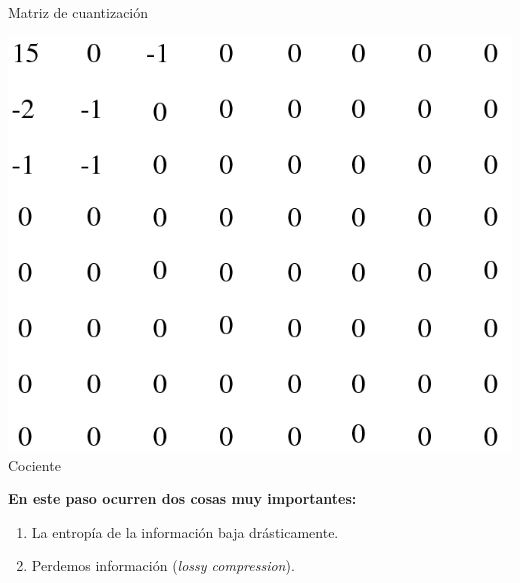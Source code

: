 \documentclass{beamer}
\begin{document}
\begin{frame}
\begin{minipage}[t]{0.3\linewidth}
\begin{center}
            \small Matriz de cuantización
        \end{center}    \end{minipage}
    \hfill
    \begin{minipage}[t]{0.3\linewidth}
        \begin{center}
            \includegraphics[scale=0.175]{fig/quantized.png}\\
            \small Cociente
        \end{center}    \end{minipage}


\end{frame}


\begin{frame}
    \textbf{En este paso ocurren dos cosas muy importantes:}
    \begin{enumerate}
        \item La entropía de la información baja drásticamente.
        \item Perdemos información (\textit{lossy compression}).
    \end{enumerate}
\end{frame}
\end{document}
